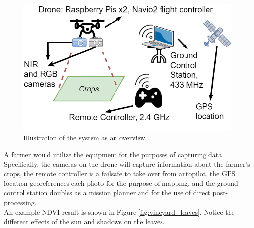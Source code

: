 \begin{figure}[H]
\centering
\includegraphics[scale=0.4]{images/drone_ndvi_scenario.png}
\caption{Illustration of the system as an overview}
\label{fig:scenario}
\end{figure}

A farmer would utilize the equipment for the purposes of capturing data. Specifically, the cameras on the drone will capture information about the farmer's crops, the remote controller is a failsafe to take over from autopilot, the GPS location georeferences each photo for the purpose of mapping, and the ground control station doubles as a mission planner and for the use of direct post-processing.\\

An example NDVI result is shown in Figure \ref{fig:vineyard_leaves}. Notice the different effects of the sun and shadows on the leaves.

